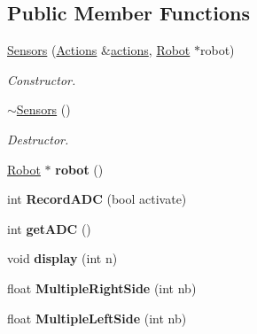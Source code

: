 \subsection*{Public Member Functions}
\begin{DoxyCompactItemize}
\item 
\mbox{\label{classSensors_ae46c462046eadf35df4f7bf49cebd50a}} 
\hyperlink{classSensors_ae46c462046eadf35df4f7bf49cebd50a}{Sensors} (\hyperlink{classActions}{Actions} \&\hyperlink{classAActionsElement_a3fbd5b8201049a59602d8b7201a9ef8a}{actions}, \hyperlink{classRobot}{Robot} $\ast$robot)
\begin{DoxyCompactList}\small\item\em Constructor. \end{DoxyCompactList}\item 
\mbox{\label{classSensors_ae8757a85e47bb4d61ef3e33cdf3e0d87}} 
\hyperlink{classSensors_ae8757a85e47bb4d61ef3e33cdf3e0d87}{$\sim$\+Sensors} ()
\begin{DoxyCompactList}\small\item\em Destructor. \end{DoxyCompactList}\item 
\mbox{\label{classSensors_aaf25dc2afdd983216b66476f69731d54}} 
\hyperlink{classRobot}{Robot} $\ast$ {\bfseries robot} ()
\item 
\mbox{\label{classSensors_ad384b8460ca2b790a84a6d2839e67851}} 
int {\bfseries Record\+A\+DC} (bool activate)
\item 
\mbox{\label{classSensors_ae4c4bd80691d241f0b933d34e2390707}} 
int {\bfseries get\+A\+DC} ()
\item 
\mbox{\label{classSensors_aeeb30192f5749b90e9be6d62792c84aa}} 
void {\bfseries display} (int n)
\item 
\mbox{\label{classSensors_a82ed981166c6a11f13325275ef9207d1}} 
float {\bfseries Multiple\+Right\+Side} (int nb)
\item 
\mbox{\label{classSensors_ace04420a1b17936b8246c2fd47fdc4a4}} 
float {\bfseries Multiple\+Left\+Side} (int nb)
\item 

\end{DoxyCompactItemize}
